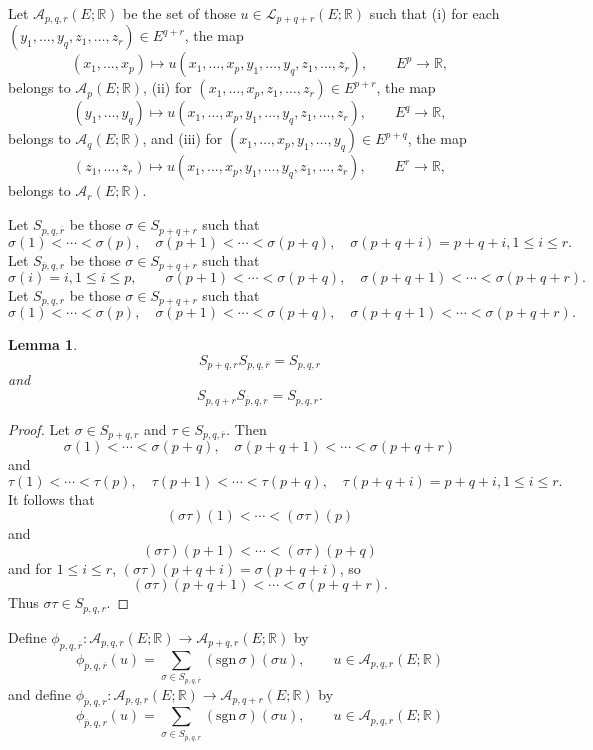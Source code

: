 \documentclass{amsart}
\newcommand{\sgn}{\mathrm{sgn}\,}
\newtheorem{lemma}[theorem]{Lemma}
\theoremstyle{definition}
\begin{document}
Let $\mathscr{A}_{p,q,r}(E;\mathbb{R})$ be the set of those
$u \in \mathscr{L}_{p+q+r}(E;\mathbb{R})$ such that (i) for each $(y_1,\ldots,y_q,z_1,\ldots,z_r) \in E^{q+r}$, the map
\[
(x_1,\ldots,x_p) \mapsto u(x_1,\ldots,x_p,y_1,\ldots,y_q,z_1,\ldots,z_r),\qquad
E^p \to \mathbb{R},
\]
belongs to $\mathscr{A}_p(E;\mathbb{R})$,  (ii)
for $(x_1,\ldots,x_p,z_1,\ldots,z_r) \in E^{p+r}$, the map
\[
(y_1,\ldots,y_q) \mapsto u(x_1,\ldots,x_p,y_1,\ldots,y_q,z_1,\ldots,z_r),
\qquad E^q \to \mathbb{R},
\]
belongs to $\mathscr{A}_q(E;\mathbb{R})$, and (iii)
for $(x_1,\ldots,x_p,y_1,\ldots,y_q) \in E^{p+q}$, the map
\[
(z_1,\ldots,z_r) \mapsto u(x_1,\ldots,x_p,y_1,\ldots,y_q,z_1,\ldots,z_r),
\qquad E^r \to \mathbb{R},
\]
belongs to $\mathscr{A}_r(E;\mathbb{R})$. 

Let $S_{p,q,\overline{r}}$ be those $\sigma \in S_{p+q+r}$ such that
\[
\sigma(1)<\cdots<\sigma(p),
\quad \sigma(p+1)<\cdots<\sigma(p+q),
\quad \sigma(p+q+i)=p+q+i, 1 \leq i \leq r.
\]
Let $S_{\overline{p},q,r}$ be those $\sigma \in S_{p+q+r}$ such that
\[
\sigma(i)=i, 1 \leq i \leq p,
\quad 
\quad \sigma(p+1)<\cdots<\sigma(p+q),
\quad \sigma(p+q+1)<\cdots<\sigma(p+q+r).
\]
Let $S_{p,q,r}$ be those $\sigma \in S_{p+q+r}$ such that
\[
\sigma(1)<\cdots<\sigma(p),
\quad \sigma(p+1)<\cdots<\sigma(p+q),
\quad \sigma(p+q+1)<\cdots<\sigma(p+q+r).
\]


\begin{lemma}
\[
S_{p+q,r} S_{p,q,\overline{r}} = S_{p,q,r}
\]
and
\[
S_{p,q+r} S_{\overline{p},q,r} = S_{p,q,r}.
\]
\label{pqr}
\end{lemma}
\begin{proof}
Let $\sigma \in S_{p+q,r}$ and $\tau \in S_{p,q,\overline{r}}$. Then 
\[
\sigma(1)<\cdots<\sigma(p+q), \quad
\sigma(p+q+1)<\cdots<\sigma(p+q+r)
\]
and
\[
\tau(1)<\cdots<\tau(p),
\quad \tau(p+1)<\cdots<\tau(p+q),
\quad \tau(p+q+i)=p+q+i, 1 \leq i \leq r.
\]
It follows that
\[
(\sigma \tau)(1)<\cdots<(\sigma \tau)(p)
\]
and
\[
(\sigma \tau)(p+1)<\cdots<(\sigma \tau)(p+q)
\]
and for $1 \leq i \leq r$,
$(\sigma \tau)(p+q+i) = \sigma(p+q+i)$, so
\[
(\sigma \tau)(p+q+1)<\cdots<\sigma(p+q+r).
\]
Thus $\sigma \tau \in S_{p,q,r}$. 
\end{proof}



Define $\phi_{p,q,\overline{r}}:\mathscr{A}_{p,q,r}(E;\mathbb{R}) \to \mathscr{A}_{p+q,r}(E;\mathbb{R})$
by 
\[
\phi_{p,q,\overline{r}}(u) = \sum_{\sigma \in S_{p,q,\overline{r}}} (\sgn \sigma)(\sigma u),
\qquad u \in \mathscr{A}_{p,q,r}(E;\mathbb{R})
\]
and
define $\phi_{\overline{p},q,r}:\mathscr{A}_{p,q,r}(E;\mathbb{R}) \to \mathscr{A}_{p,q+r}(E;\mathbb{R})$
by 
\[
\phi_{\overline{p},q,r}(u) = \sum_{\sigma \in S_{\overline{p},q,r}} (\sgn \sigma)(\sigma u),
\qquad u \in \mathscr{A}_{p,q,r}(E;\mathbb{R})
\]
\end{document}
